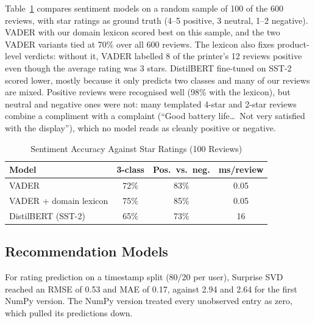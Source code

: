 \documentclass[conference]{IEEEtran}
\begin{document}
Table~\ref{tab:sent} compares sentiment models on a random sample of 100 of the 600 reviews, with star ratings as ground truth (4--5 positive, 3 neutral, 1--2 negative). VADER with our domain lexicon scored best on this sample, and the two VADER variants tied at 70\% over all 600 reviews. The lexicon also fixes product-level verdicts: without it, VADER labelled 8 of the printer's 12 reviews positive even though the average rating was 3 stars. DistilBERT fine-tuned on SST-2 scored lower, mostly because it only predicts two classes and many of our reviews are mixed. Positive reviews were recognised well (98\% with the lexicon), but neutral and negative ones were not: many templated 4-star and 2-star reviews combine a compliment with a complaint (``Good battery life\ldots\ Not very satisfied with the display''), which no model reads as cleanly positive or negative.

\begin{table}[t]
\caption{Sentiment Accuracy Against Star Ratings (100 Reviews)}
\label{tab:sent}
\centering
\begin{tabular}{@{}lccc@{}}
\toprule
Model & 3-class & Pos.\ vs.\ neg. & ms/review \\
\midrule
VADER & 72\% & 83\% & 0.05 \\
VADER + domain lexicon & 75\% & 85\% & 0.05 \\
DistilBERT (SST-2) & 65\% & 73\% & 16 \\
\bottomrule
\end{tabular}
\end{table}

\subsection{Recommendation Models}
For rating prediction on a timestamp split (80/20 per user), Surprise SVD reached an RMSE of 0.53 and MAE of 0.17, against 2.94 and 2.64 for the first NumPy version. The NumPy version treated every unobserved entry as zero, which pulled its predictions down.
\end{document}
